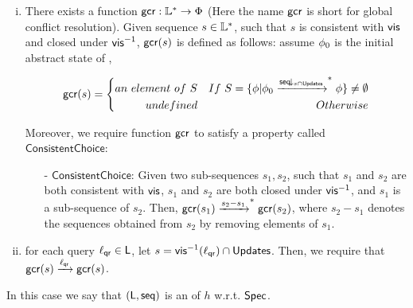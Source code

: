 {\begin{definition}
\begin{enumerate}[(i)]
\item There exists a function $\mathsf{gcr}: \mathbb{L}^* \rightarrow \Phi$ (Here the name $\mathsf{gcr}$ is short for global conflict resolution). Given sequence $s \in \mathbb{L}^*$, such that $s$ is consistent with $\mathsf{vis}$ and closed under $\mathsf{vis}^{-1}$, $\mathsf{gcr}(s)$ is defined as follows: assume $\phi_0$ is the initial abstract state of \Spec{},

$$ \mathsf{gcr}(s)=\left\{
\begin{aligned}
an \ element \ of \ S &  & If \ S = \{ \phi \vert \phi_0 \xrightarrow{ \mathsf{seq}\!\downarrow_{s\cap \mathsf{Updates}} }^* \phi \} \neq \emptyset \\
undefined & & Otherwise
\end{aligned}
\right.
$$


Moreover, we require function $\mathsf{gcr}$ to satisfy a property called $\mathsf{ConsistentChoice}$:

\begin{itemize}
\setlength{\itemsep}{0.5pt}
\item[-] $\mathsf{ConsistentChoice}$: Given two sub-sequences $s_1,s_2$, such that $s_1$ and $s_2$ are both consistent with $\mathsf{vis}{}$, $s_1$ and $s_2$ are both closed under $\mathsf{vis}{}^{-1}$, and $s_1$ is a sub-sequence of $s_2$. Then, $\mathsf{gcr}(s_1) \xrightarrow{ s_2 - s_1 }^* \mathsf{gcr}(s_2)$, where $s_2 - s_1$ denotes the sequences obtained from $s_2$ by removing elements of $s_1$.

\end{itemize}

\item for each query $\ell_{\mathsf{qr}}\in \mathsf{L}$, let $s = \mathsf{vis}^{-1}(\ell_{\mathsf{qr}})\cap \mathsf{Updates}$. Then, we require that $\mathsf{gcr}(s) \xrightarrow{ \ell_{\mathsf{qr}} } \mathsf{gcr}(s)$.
\end{enumerate}
In this case we say that $(\mathsf{L}, \mathsf{seq})$ is an \emph{\crdtlinearization{}} of $h$ w.r.t. $\mathsf{Spec}{}$.
\end{definition}

}

